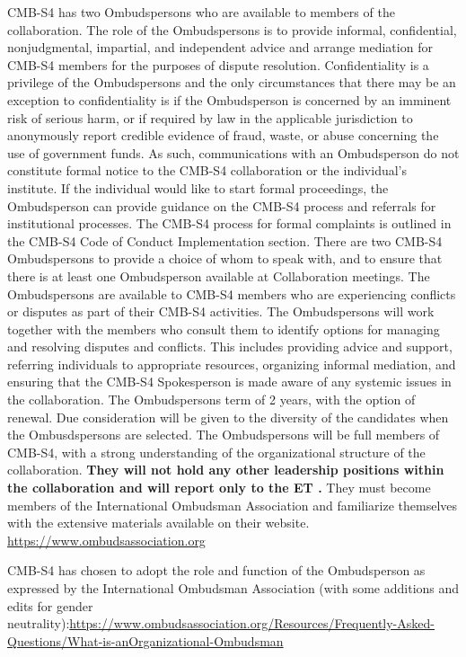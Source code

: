 \documentclass[12pt]{article}
\newcommand{\exec}{{Executive Team}}
\newcommand{\shorte}{{ET }}  %
\begin{document}
CMB-S4 has two Ombudspersons who are available to members of the collaboration. The role of the Ombudspersons is to provide informal, confidential, nonjudgmental, impartial, and independent advice and arrange mediation for CMB-S4 members for the purposes of dispute resolution. Confidentiality is a privilege of the Ombudspersons and the only circumstances that there may be an exception to confidentiality is if the Ombudsperson is concerned by an imminent risk of serious harm, or if required by law in the applicable jurisdiction to anonymously report credible evidence of fraud, waste, or abuse concerning the use of government funds. As such, communications with an Ombudsperson do not constitute formal notice to the CMB-S4 collaboration or the individual's institute. If the individual would like to start formal proceedings, the Ombudsperson can provide guidance on the CMB-S4 process and referrals for institutional processes. The CMB-S4 process for formal complaints is outlined in the CMB-S4 Code of Conduct Implementation section. There are two CMB-S4 Ombudspersons to provide a choice of whom to speak with, and to ensure that there is at least one Ombudsperson available at Collaboration meetings. The Ombudspersons are available to CMB-S4 members who are experiencing conflicts or disputes as part of their CMB-S4 activities. The Ombudspersons will work together with the members who consult them to identify options for managing and resolving disputes and conflicts. This includes providing advice and support, referring individuals to appropriate resources, organizing informal mediation, and ensuring that the CMB-S4 Spokesperson is made aware of any systemic issues in the collaboration. The Ombudspersons term of 2 years, with the option of renewal. Due consideration will be given to the diversity of the candidates when the Ombusdspersons are selected. The Ombudspersons will be full members of CMB-S4, with a strong understanding of the organizational structure of the collaboration. \textbf{They will not hold any other leadership positions within the collaboration and will report only to the \shorte.} They must become members of the International Ombudsman Association and familiarize themselves with the extensive materials available on their website. \url{https://www.ombudsassociation.org}

CMB-S4  has chosen to adopt the role and function of the Ombudsperson as expressed by the International Ombudsman Association (with some additions and edits for gender neutrality):\url{https://www.ombudsassociation.org/Resources/Frequently-Asked-Questions/What-is-anOrganizational-Ombudsman}
\end{document}
